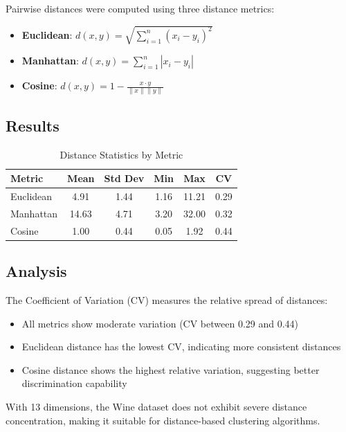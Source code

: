 \documentclass[12pt,a4paper]{article}
\begin{document}
Pairwise distances were computed using three distance metrics:
\begin{itemize}
    \item \textbf{Euclidean}: $d(x, y) = \sqrt{\sum_{i=1}^{n}(x_i - y_i)^2}$
    \item \textbf{Manhattan}: $d(x, y) = \sum_{i=1}^{n}|x_i - y_i|$
    \item \textbf{Cosine}: $d(x, y) = 1 - \frac{x \cdot y}{\|x\| \|y\|}$
\end{itemize}

\subsection{Results}

\begin{table}[H]
\centering
\caption{Distance Statistics by Metric}
\label{tab:distances}
\begin{tabular}{lccccc}
\toprule
\textbf{Metric} & \textbf{Mean} & \textbf{Std Dev} & \textbf{Min} & \textbf{Max} & \textbf{CV} \\
\midrule
Euclidean & 4.91 & 1.44 & 1.16 & 11.21 & 0.29 \\
Manhattan & 14.63 & 4.71 & 3.20 & 32.00 & 0.32 \\
Cosine & 1.00 & 0.44 & 0.05 & 1.92 & 0.44 \\
\bottomrule
\end{tabular}
\end{table}

\subsection{Analysis}

The Coefficient of Variation (CV) measures the relative spread of distances:
\begin{itemize}
    \item All metrics show moderate variation (CV between 0.29 and 0.44)
    \item Euclidean distance has the lowest CV, indicating more consistent distances
    \item Cosine distance shows the highest relative variation, suggesting better discrimination capability
\end{itemize}

With 13 dimensions, the Wine dataset does not exhibit severe distance concentration, making it suitable for distance-based clustering algorithms.

\end{document}
